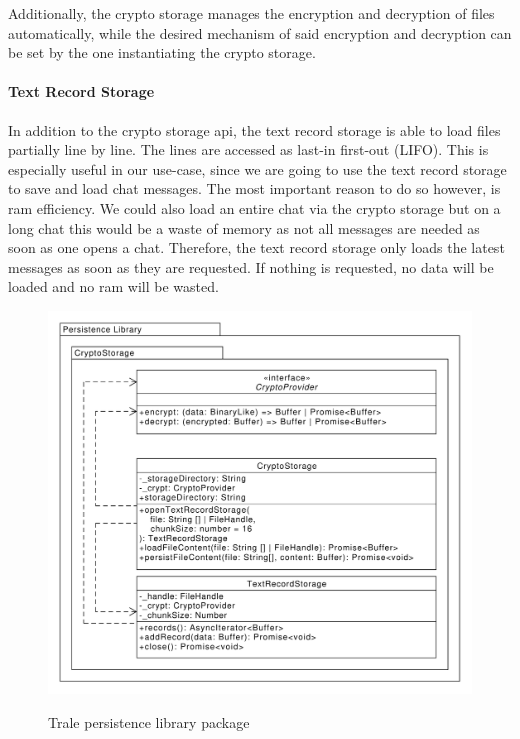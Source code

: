 Additionally, the crypto storage manages the encryption and decryption of files automatically, while the desired
mechanism of said encryption and decryption can be set by the one instantiating the crypto storage.

\paragraph{Text Record Storage}

In addition to the crypto storage \ac{api}, the text record storage is able to load files partially line by line.
The lines are accessed as last-in first-out (LIFO).
This is especially useful in our use-case, since we are going to use the text record storage to save and load chat
messages.
The most important reason to do so however, is \ac{ram} efficiency.
We could also load an entire chat via the crypto storage but on a long chat this would be a waste of memory as not all
messages are needed as soon as one opens a chat.
Therefore, the text record storage only loads the latest messages as soon as they are requested.
If nothing is requested, no data will be loaded and no \ac{ram} will be wasted.
\begin{figure}[H]
    \centering
    \caption{Trale persistence library package}
    \includegraphics[width=1\textwidth]{./graphics/classDiagramPersistenceLibrary}
    \label{fig:figure38}
\end{figure}
